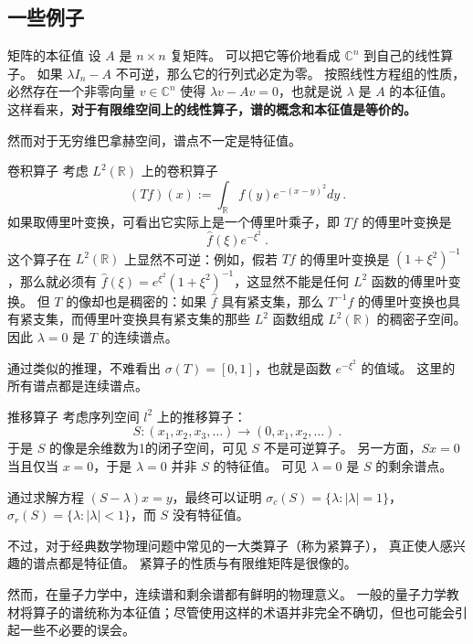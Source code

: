 \subsection{一些例子}
\begin{example}{矩阵的本征值}
设 $A$ 是 $n\times n$ 复矩阵。 可以把它等价地看成 $\mathbb{C}^n$ 到自己的线性算子。 如果 $\lambda I_n-A$ 不可逆，那么它的行列式必定为零。 按照线性方程组的性质，必然存在一个非零向量 $v\in \mathbb{C}^n$ 使得 $\lambda v-Av=0$，也就是说 $\lambda$ 是 $A$ 的本征值。 这样看来，\textbf{对于有限维空间上的线性算子，谱的概念和本征值是等价的。}
\end{example}

然而对于无穷维巴拿赫空间，谱点不一定是特征值。

\begin{example}{卷积算子}
考虑 $L^2(\mathbb{R})$ 上的卷积算子
$$
(Tf)(x):=\int_{\mathbb{R}}f(y)e^{-(x-y)^2}dy~.
$$
如果取傅里叶变换，可看出它实际上是一个傅里叶乘子，即 $Tf$ 的傅里叶变换是
$$
\hat f(\xi)e^{-\xi^2}~.
$$
这个算子在 $L^2(\mathbb{R})$ 上显然不可逆：例如，假若 $Tf$ 的傅里叶变换是 $(1+\xi^2)^{-1}$，那么就必须有 $\hat f(\xi)=e^{\xi^2}(1+\xi^2)^{-1}$，这显然不能是任何 $L^2$ 函数的傅里叶变换。 但 $T$ 的像却也是稠密的：如果 $\hat f$ 具有紧支集，那么 $T^{-1}f$ 的傅里叶变换也具有紧支集，而傅里叶变换具有紧支集的那些 $L^2$ 函数组成 $L^2(\mathbb{R})$ 的稠密子空间。 因此 $\lambda=0$ 是 $T$ 的连续谱点。

通过类似的推理，不难看出 $\sigma(T)=[0,1]$，也就是函数 $e^{-\xi^2}$ 的值域。 这里的所有谱点都是连续谱点。
\end{example}

\begin{example}{推移算子}
考虑序列空间 $l^2$ 上的推移算子：
$$
S:(x_1,x_2,x_3,\dots)\to(0,x_1,x_2,\dots)~.
$$
于是 $S$ 的像是余维数为1的闭子空间，可见 $S$ 不是可逆算子。 另一方面，$Sx=0$ 当且仅当 $x=0$，于是 $\lambda=0$ 并非 $S$ 的特征值。 可见 $\lambda=0$ 是 $S$ 的剩余谱点。

通过求解方程 $(S-\lambda)x=y$，最终可以证明 $\sigma_c(S)=\{\lambda:|\lambda|=1\}$，$\sigma_r(S)=\{\lambda:|\lambda|<1\}$，而 $S$ 没有特征值。
\end{example}

不过，对于经典数学物理问题中常见的一大类算子（称为紧算子）， 真正使人感兴趣的谱点都是特征值。 紧算子的性质与有限维矩阵是很像的。

然而，在量子力学中，连续谱和剩余谱都有鲜明的物理意义。 一般的量子力学教材将算子的谱统称为本征值；尽管使用这样的术语并非完全不确切，但也可能会引起一些不必要的误会。
